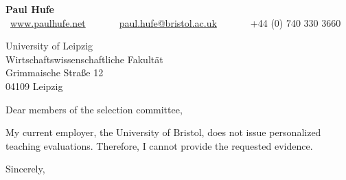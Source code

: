 \documentclass[11pt, a4paper]{letter}
\date{}
\begin{document}
\begin{center}
{\LARGE \centering \textbf{Paul Hufe}}\\
{\small \faMousePointer~\href{https://www.paulhufe.net}{www.paulhufe.net}~~~~~~\faEnvelope~\href{mailto:paul.hufe@bristol.ac.uk}{paul.hufe@bristol.ac.uk}~~~~~~\faPhone~+44 (0) 740 330 3660}
\end{center}

\begingroup
\let\clearpage\relax
\let\cleardoublepage\relax
\let\newpage\relax
\vspace{1cm}

\begin{letter}{University of Leipzig \\ Wirtschaftswissenschaftliche Fakultät \\ Grimmaische Straße 12 \\ 04109 Leipzig}


\opening{Dear members of the selection committee,}

My current employer, the University of Bristol, does not issue personalized teaching evaluations. Therefore, I cannot provide the requested evidence.


\begin{flushleft}
\closing{Sincerely,}
\end{flushleft}

\end{letter}
\endgroup
\end{document}
